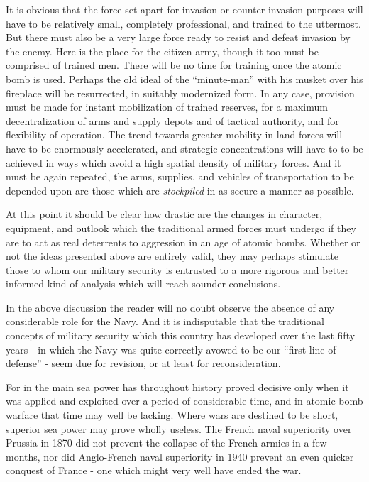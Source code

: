 It is obvious that the force set apart for invasion or counter-invasion purposes will have to be relatively small, completely professional, and trained to the uttermost. But there must also be a very large force ready to resist and defeat invasion by the enemy. Here is the place for the citizen army, though it too must be comprised of trained men. There will be no time for training once the atomic bomb is used. Perhaps the old ideal of the ``minute-man'' with his musket over his fireplace will be resurrected, in suitably modernized form. In any case, provision must be made for instant mobilization of trained reserves, for a maximum decentralization of arms and supply depots and of tactical authority, and for flexibility of operation. The trend towards greater mobility in land forces will have to be enormously accelerated, and strategic concentrations will have to to be achieved in ways which avoid a high spatial density of military forces. And it must be again repeated, the arms, supplies, and vehicles of transportation to be depended upon are those which are \emph{stockpiled} in as secure a manner as possible.

At this point it should be clear how drastic are the changes in character, equipment, and outlook which the traditional armed forces must undergo if they are to act as real deterrents to aggression in an age of atomic bombs. Whether or not the ideas presented above are entirely valid, they may perhaps stimulate those to whom our military security is entrusted to a more rigorous and better informed kind of analysis which will reach sounder conclusions.

In the above discussion the reader will no doubt observe the absence of any considerable role for the Navy. And it is indisputable that the traditional concepts of military security which this country has developed over the last fifty years - in which the Navy was quite correctly avowed to be our ``first line of defense'' - seem due for revision, or at least for reconsideration.

For in the main sea power has throughout history proved decisive only when it was applied and exploited over a period of considerable time, and in atomic bomb warfare that time may well be lacking. Where wars are destined to be short, superior sea power may prove wholly useless. The French naval superiority over Prussia in 1870 did not prevent the collapse of the French armies in a few months, nor did Anglo-French naval superiority in 1940 prevent an even quicker conquest of France - one which might very well have ended the war.


